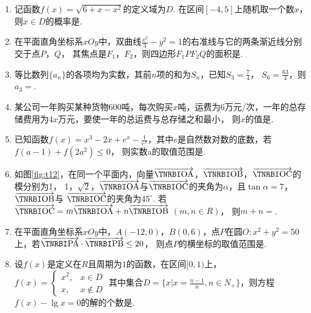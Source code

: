 \documentclass[12pt,space]{ctexart} %
\begin{document}
\begin{enumerate}[itemsep=-0.3em,topsep=0pt]
  \item 记函数$\displaystyle{f(x)=\sqrt{6+x-x^2}}$的定义域为$D$. 在区间$[-4,5]$上随机取一个数$x$，
        则$x\in D$的概率是.
  \item 在平面直角坐标系$xOy$中，双曲线$\displaystyle{\frac{x^2}{3}-y^2=1}$的右准线与它的两条渐近线分别交于点$P$，$Q$，
        其焦点是$F_1$，$F_2$，则四边形$F_1PF_2Q$的面积是.
  \item 等比数列$\{a_n\}$的各项均为实数，其前$n$项的和为$S_n$，已知$\displaystyle{S_3=\frac{7}{4}}$，
        $\displaystyle{S_6=\frac{63}{4}}$，则$a_3=$.
  \item 某公司一年购买某种货物$600$吨，每次购买$x$吨，运费为$6$万元/次，一年的总存储费用为$4x$万元，要使一年的总运费与总存储之和最小，
        则$x$的值是.
  \item 已知函数$\displaystyle{f(x)=x^3-2x+e^x-\frac{1}{e^x}}$，其中$e$是自然数对数的底数，若$f(a-1)+f(2a^2)\leq 0$，
        则实数a的取值范围是\blank{$[-1, \frac{1}{2}]$}.
  \item 如图\ref{fig:t12}，在同一个平面内，向量$\overrightarrow{\bfit{OA}}$，$\overrightarrow{\bfit{OB}}$，$\overrightarrow{\bfit{OC}}$的模分别为1，
        1，$\sqrt{2}$，$\overrightarrow{\bfit{OA}}$与$\overrightarrow{\bfit{OC}}$的夹角为$\alpha$，且$\tan\alpha=7$，$\overrightarrow{\bfit{OB}}$与
        $\overrightarrow{\bfit{OC}}$的夹角为$45^\circ$. 若$\overrightarrow{\bfit{OC}}=m\overrightarrow{\bfit{OA}}+n\overrightarrow{\bfit{OB}}$ $(m, n \in R)$，
        则$m+n=$.
  \item 在平面直角坐标系$xOy$中，$A(-12,0)$，$B(0,6)$，点$P$在圆$O: x^2+y^2=50$上，若$\overrightarrow{\bfit{PA}}\cdot\overrightarrow{\bfit{PB}}\leq 20$，
        则点$P$的横坐标的取值范围是\blank{$[-5\sqrt{2}, 1]$}.
  \item 设$f(x)$是定义在$R$且周期为$1$的函数，在区间$[0,1)$上，$\displaystyle{f(x)=\begin{cases}x^2,&x\in D\\x,&x\notin D\end{cases}}$
        其中集合$\displaystyle{D=\{x|x=\frac{n-1}{n}, n\in N_+\}}$，则方程$f(x)-\lg x=0$的解的个数是.
\end{enumerate}
\end{document}
